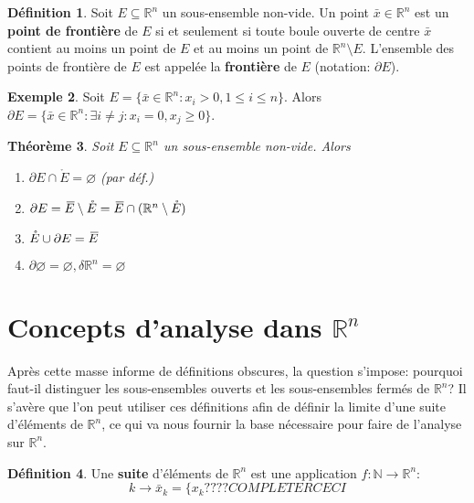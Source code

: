 \documentclass{report}
\theoremstyle{plain}
\newtheorem{thm}{Théorème}[chapter]
\theoremstyle{definition}
\newtheorem{defn}[thm]{Définition}
\newtheorem{exmp}[thm]{Exemple}
\theoremstyle{remark}
\newcommand*{\skol}[2][3]{{}\mkern#1mu\overline{\mkern-#1mu#2}} %
\newcommand*\adh[1]{\skol{#1}}
\newcommand*{\interior}[1]{\mathring{#1}}
\newcommand*{\frontier}[1]{\partial #1}
\begin{document}
\begin{defn}
	Soit $E \subseteq \mathbb R^n$ un sous-ensemble non-vide. Un point $\bar x \in \mathbb R^n$ est un \textbf{point de frontière} de $E$ si et seulement si toute boule ouverte de centre $\bar x$ contient au moins un point de $E$ et au moins un point de $\mathbb R^n \setminus E$. L'ensemble des points de frontière de $E$ est appelée la \textbf{frontière} de $E$ (notation: $\frontier E$).
\end{defn}

\begin{exmp}
	Soit $E = \{\bar x \in \mathbb R^n : x_i > 0, 1 \leq i \leq n\}$. Alors $\frontier E = \{\bar x \in \mathbb R^n : \exists i \neq j : x_i = 0, x_j \geq 0\}$.
\end{exmp}

\begin{thm}
	Soit $E \subseteq \mathbb R^n$ un sous-ensemble non-vide. Alors
	\begin{enumerate}
		\item $\frontier E \cap \interior E = \varnothing$ (par déf.)
		\item $\frontier E = \adh E \setminus \interior E = \adh E \cap (\mathbb R^n \setminus \interior E)$
		\item $\interior E \cup \frontier E = \adh E$
		\item $\frontier \varnothing = \varnothing, \delta \mathbb R^n = \varnothing$
	\end{enumerate}
\end{thm}

\section{Concepts d'analyse dans $\mathbb R^n$}
Après cette masse informe de définitions obscures, la question s'impose: pourquoi faut-il distinguer les sous-ensembles ouverts et les sous-ensembles fermés de $\mathbb R^n$? Il s'avère que l'on peut utiliser ces définitions afin de définir la limite d'une suite d'éléments de $\mathbb R^n$, ce qui va nous fournir la base nécessaire pour faire de l'analyse sur $\mathbb R^n$.

\begin{defn}
	Une \textbf{suite} d'éléments de $\mathbb R^n$ est une application $f : \mathbb N \to \mathbb R^n$:
	\begin{equation}
		k \to \bar x_k = \{x_k???? COMPLETER CECI
	\end{equation}
\end{defn}
\end{document}
